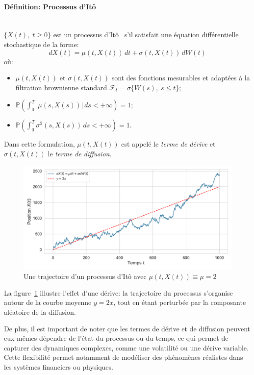 \paragraph{Définition: Processus d'Itô}\mbox{}\\
$\{X(t),\;t \geq 0\}$ est un processus d'Itô~\cite{ito1944} s'il satisfait une équation différentielle stochastique de la forme:
\begin{equation}
    dX(t) = \mu(t, X(t))\,dt + \sigma(t, X(t))\,dW(t)
\end{equation}\label{ito_eq}
où:
\begin{itemize}
    \item $\mu(t, X(t))$ et $\sigma(t, X(t))$ sont des fonctions mesurables et adaptées à la filtration brownienne standard $\mathcal{F}_t=\sigma\{W(s),\;s\leq t\}$;
    \item $\mathds{P}\left( \int_0^T |\mu(s, X(s))|\,ds < +\infty \right) = 1$;
    \item $\mathds{P}\left( \int_0^T \sigma^2(s, X(s))\,ds < +\infty \right) = 1$.
\end{itemize}
Dans cette formulation, $\mu(t, X(t))$ est appelé le \textit{terme de dérive} et $\sigma(t, X(t))$ le \textit{terme de diffusion}.
\begin{figure}[htb]
    \centering
    \includegraphics[width=0.9\linewidth]{img/intro/path_drift.pdf}
    \caption{Une trajectoire d'un processus d'Itô avec $\mu(t, X(t)) \equiv \mu = 2$}\label{fig:TrajIto}
\end{figure}
\FloatBarrier La figure~\ref{fig:TrajIto} illustre l'effet d'une dérive: la trajectoire du processus s'organise autour de la courbe moyenne \( y = 2x \), tout en étant perturbée par la composante aléatoire de la diffusion.

De plus, il est important de noter que les termes de dérive et de diffusion peuvent eux-mêmes dépendre de l'état du processus ou du temps, ce qui permet de capturer des dynamiques complexes, comme une volatilité ou une dérive variable. Cette flexibilité permet notamment de modéliser des phénomènes réalistes dans les systèmes financiers ou physiques.

